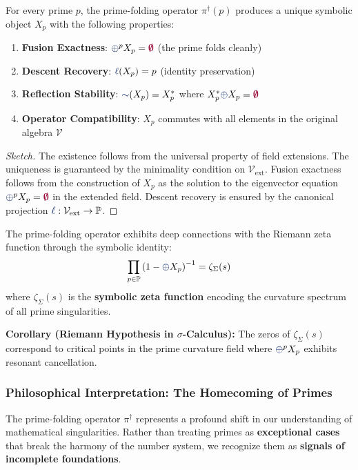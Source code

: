 \begin{theorem}
For every prime $p$, the prime-folding operator $\pi^\dagger(p)$ produces a unique symbolic object $X_p$ with the following properties:
\begin{enumerate}
    \item \textbf{Fusion Exactness}: $\fuse^p X_p = \void$ (the prime folds cleanly)
    \item \textbf{Descent Recovery}: $\lha(X_p) = p$ (identity preservation)
    \item \textbf{Reflection Stability}: $\reflec(X_p) = X_p^*$ where $X_p^* \fuse X_p = \void$
    \item \textbf{Operator Compatibility}: $X_p$ commutes with all elements in the original algebra $\mathcal{V}$
\end{enumerate}
\end{theorem}

\begin{proof}[Sketch]
The existence follows from the universal property of field extensions. The uniqueness is guaranteed by the minimality condition on $\mathcal{V}_{\text{ext}}$. Fusion exactness follows from the construction of $X_p$ as the solution to the eigenvector equation $\fuse^p X_p = \void$ in the extended field. Descent recovery is ensured by the canonical projection $\lha: \mathcal{V}_{\text{ext}} \to \mathbb{P}$.
\end{proof}

\begin{theorem}
The prime-folding operator exhibits deep connections with the Riemann zeta function through the symbolic identity:
\[ \prod_{p \in \mathbb{P}} \left(1 - \fuse X_p\right)^{-1} = \zeta_\Sigma(s) \]
where $\zeta_\Sigma(s)$ is the \textbf{symbolic zeta function} encoding the curvature spectrum of all prime singularities.
\end{theorem}

\textbf{Corollary (Riemann Hypothesis in $\sigma$-Calculus):} The zeros of $\zeta_\Sigma(s)$ correspond to critical points in the prime curvature field where $\fuse^p X_p$ exhibits resonant cancellation.

\subsubsection{Philosophical Interpretation: The Homecoming of Primes}
The prime-folding operator $\pi^\dagger$ represents a profound shift in our understanding of mathematical singularities. Rather than treating primes as \textbf{exceptional cases} that break the harmony of the number system, we recognize them as \textbf{signals of incomplete foundations}.

